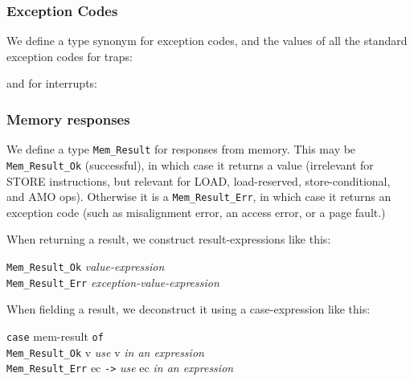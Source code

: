 \documentclass[11pt]{article}
\newcommand{\hm}{\hspace*{1em}}
\newcommand{\hmmm}{\hspace*{3em}}
\begin{document}

\subsubsection{Exception Codes}

We define a type synonym for exception codes, and the values of all
the standard exception codes for traps:



and for interrupts:




\subsubsection{Memory responses}

\label{sec_mem_responses}

We define a type {\tt Mem\_Result} for responses from memory.  This
may be {\tt Mem\_Result\_Ok} (successful), in which case it returns a
value (irrelevant for STORE instructions, but relevant for LOAD,
load-reserved, store-conditional, and AMO ops).  Otherwise it is a
{\tt Mem\_Result\_Err}, in which case it returns an exception code
(such as misalignment error, an access error, or a page fault.)



When returning a result, we construct result-expressions like this:
\begin{tabbing}
\hmmm \= {\tt Mem\_Result\_Ok} \hm \= \emph{value-expression} \\
      \> {\tt Mem\_Result\_Err}    \> \emph{exception-value-expression}
\end{tabbing}

When fielding a result, we deconstruct it using a case-expression like this:
\begin{tabbing}
\hmmm \= {\tt case} mem-result {\tt of} \\
      \> \hm \= {\tt Mem\_Result\_Ok} v \hm {\tt ->} \= \emph{use} v \emph{in an expression} \\
      \>     \> {\tt Mem\_Result\_Err} ec   {\tt ->} \> \emph{use} ec \emph{in an expression}
\end{tabbing}

\end{document}
